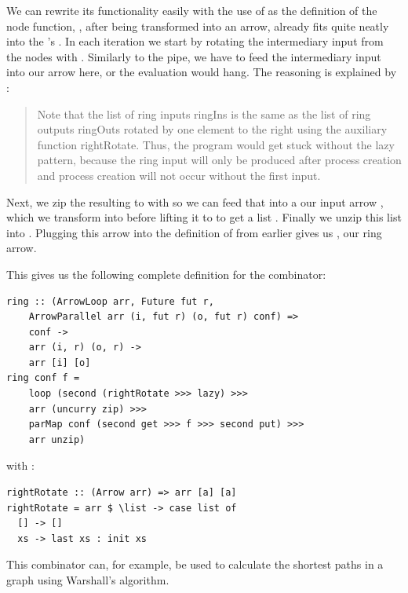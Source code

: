 We can rewrite its functionality easily with the use of  as the definition of the node function, , after being transformed into an arrow, already fits quite neatly into the 's . In each iteration we start by rotating the intermediary input from the nodes \code{[fut r]} with . Similarly to the pipe, we have to feed the intermediary input into our  arrow here, or the evaluation would hang. The reasoning is explained by \cite{eden_cefp}:
\begin{quotation}
Note that the list of ring inputs ringIns is the same as the list of ring outputs ringOuts rotated by one element to the right using the auxiliary function rightRotate. Thus, the program would get stuck without the lazy pattern, because the ring input will only be produced after process creation and process creation will not occur without the first input.
\end{quotation}
Next, we zip the resulting \code{([i], [fut r])} to \code{[(i, fut r)]} with  so we can feed that into a our input arrow , which we transform into  before lifting it to  to get a list \code{[(o, fut r)]}. Finally we unzip this list into \code{([o], [fut r])}. Plugging this arrow  into the definition of  from earlier gives us , our ring arrow.


This gives us the following complete definition for the  combinator:
\begin{lstlisting}[frame=htrbl]
ring :: (ArrowLoop arr, Future fut r,
	ArrowParallel arr (i, fut r) (o, fut r) conf) =>
    conf ->
    arr (i, r) (o, r) ->
    arr [i] [o]
ring conf f =
	loop (second (rightRotate >>> lazy) >>>
    arr (uncurry zip) >>>
    parMap conf (second get >>> f >>> second put) >>>
    arr unzip)
\end{lstlisting}
with :
\begin{lstlisting}[frame=htrbl]
rightRotate :: (Arrow arr) => arr [a] [a]
rightRotate = arr $ \list -> case list of 
  [] -> []
  xs -> last xs : init xs
\end{lstlisting} %
This combinator can, for example, be used to calculate the shortest paths in a graph using Warshall's algorithm. 
